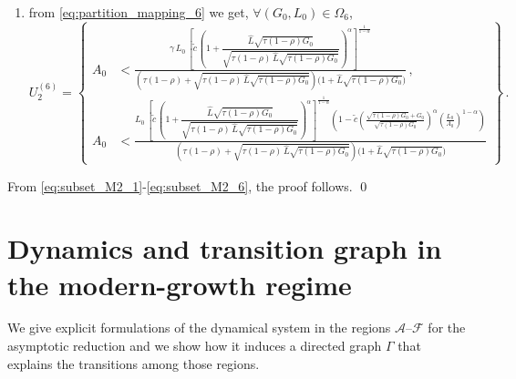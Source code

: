 \documentclass[a4paper,fleqn]{cas-sc}
\begin{document}
\begin{enumerate}
\begin{equation}
\begin{aligned}
            A_0 &< \frac{L_0\,\left[\tilde{c}\,\left(1+\dfrac{\theta L_0\sqrt{\tau(1-\rho)G_0}}{\sqrt{\tau(1-\rho)\,\theta L_0\sqrt{\tau(1-\rho)G_0}}}\right)^{\alpha}\right]^{\frac{1}{1-\alpha}}\left(1-\tilde{c}\left(\frac{\sqrt{\tau(1-\rho)G_0}+G_0}{\sqrt{\tau(1-\rho)G_0}}\right)^{\alpha}\left(\frac{L_0}{A_0}\right)^{1-\alpha}\right)}{\left(\tau(1-\rho)+\sqrt{\tau(1-\rho)\,\theta L_0\sqrt{\tau(1-\rho)G_0}}\right)\Big(1+\theta L_0\sqrt{\tau(1-\rho)G_0}\Big)}
        \end{aligned}
        \right\}\,;
    \end{equation}
    \item from \eqref{eq:partition_mapping_6} we get, $\forall (G_0,L_0)\in\Omega_6$,
    \begin{equation}\label{eq:subset_M2_6}
        U_2^{(6)} = \left\{ 
        \begin{aligned}
            A_0 &< \frac{\gamma\,L_0\,\left[\tilde{c}\,\left(1+\dfrac{\hat{L}\sqrt{\tau(1-\rho)G_0}}{\sqrt{\tau(1-\rho)\,\hat{L}\sqrt{\tau(1-\rho)G_0}}}\right)^{\alpha}\right]^{\frac{1}{1-\alpha}}}{\left(\tau(1-\rho)+\sqrt{\tau(1-\rho)\,\hat{L}\sqrt{\tau(1-\rho)G_0}}\right)\Big(1+\hat{L}\sqrt{\tau(1-\rho)G_0}\Big)}\,,\\[10pt]
            A_0 &< \frac{L_0\,\left[\tilde{c}\,\left(1+\dfrac{\hat{L}\sqrt{\tau(1-\rho)G_0}}{\sqrt{\tau(1-\rho)\,\hat{L}\sqrt{\tau(1-\rho)G_0}}}\right)^{\alpha}\right]^{\frac{1}{1-\alpha}}\left(1-\tilde{c}\left(\frac{\sqrt{\tau(1-\rho)G_0}+G_0}{\sqrt{\tau(1-\rho)G_0}}\right)^{\alpha}\left(\frac{L_0}{A_0}\right)^{1-\alpha}\right)}{\left(\tau(1-\rho)+\sqrt{\tau(1-\rho)\,\hat{L}\sqrt{\tau(1-\rho)G_0}}\right)\Big(1+\hat{L}\sqrt{\tau(1-\rho)G_0}\Big)}
        \end{aligned}
        \right\}\,.
    \end{equation}
\end{enumerate}

From \eqref{eq:subset_M2_1}-\eqref{eq:subset_M2_6}, the proof follows.
\qed

\section{Dynamics and transition graph in the modern-growth regime}\label{appenix_C}

We give explicit formulations of the dynamical system in the regions $\mathcal A$--$\mathcal F$ for the asymptotic reduction and we show how it induces a directed graph $\Gamma$ that explains the transitions among those regions.
\end{document}
